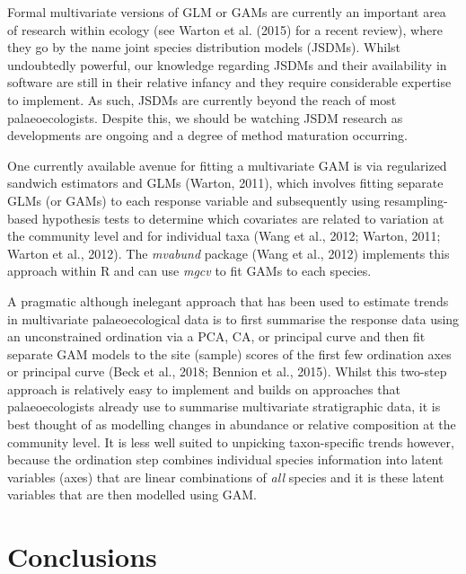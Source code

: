\documentclass[12pt,]{article}
\begin{document}
Formal multivariate versions of GLM or GAMs are currently an important
area of research within ecology (see Warton et al. (2015) for a recent
review), where they go by the name joint species distribution models
(JSDMs). Whilst undoubtedly powerful, our knowledge regarding JSDMs and
their availability in software are still in their relative infancy and
they require considerable expertise to implement. As such, JSDMs are
currently beyond the reach of most palaeoecologists. Despite this, we
should be watching JSDM research as developments are ongoing and a
degree of method maturation occurring.

One currently available avenue for fitting a multivariate GAM is via
regularized sandwich estimators and GLMs (Warton, 2011), which involves
fitting separate GLMs (or GAMs) to each response variable and
subsequently using resampling-based hypothesis tests to determine which
covariates are related to variation at the community level and for
individual taxa (Wang et al., 2012; Warton, 2011; Warton et al., 2012).
The \emph{mvabund} package (Wang et al., 2012) implements this approach
within R and can use \emph{mgcv} to fit GAMs to each species.

A pragmatic although inelegant approach that has been used to estimate
trends in multivariate palaeoecological data is to first summarise the
response data using an unconstrained ordination via a PCA, CA, or
principal curve and then fit separate GAM models to the site (sample)
scores of the first few ordination axes or principal curve (Beck et al.,
2018; Bennion et al., 2015). Whilst this two-step approach is relatively
easy to implement and builds on approaches that palaeoecologists already
use to summarise multivariate stratigraphic data, it is best thought of
as modelling changes in abundance or relative composition at the
community level. It is less well suited to unpicking taxon-specific
trends however, because the ordination step combines individual species
information into latent variables (axes) that are linear combinations of
\emph{all} species and it is these latent variables that are then
modelled using GAM.

\section{Conclusions}\label{conclusions}
\end{document}
